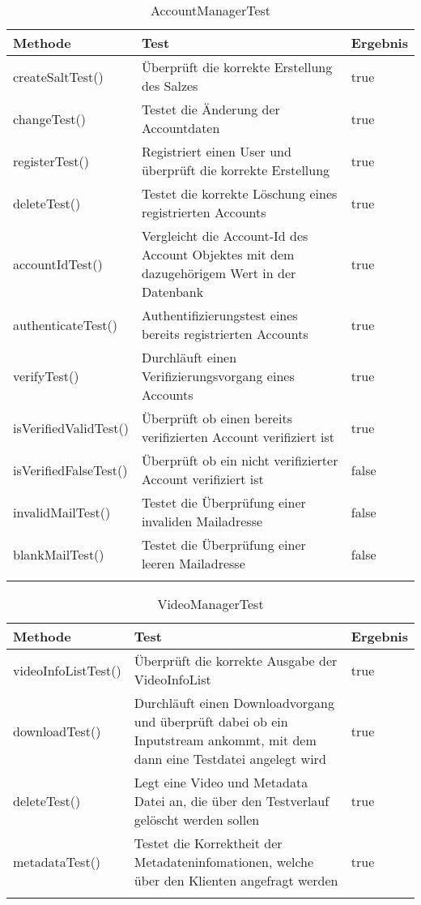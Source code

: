  \begin{longtable}{p{} | p{} | p{}}
\hline
  \textbf{Methode} & \textbf{Test} & \textbf{Ergebnis}\\
  \hline
  createSaltTest() & Überprüft die korrekte Erstellung des Salzes & true \\
  \hline
  changeTest() & Testet die Änderung der Accountdaten & true \\
  \hline
  registerTest() & Registriert einen User und überprüft die korrekte Erstellung & true \\
  \hline
  deleteTest() & Testet die korrekte Löschung eines registrierten Accounts & true \\
  \hline
  accountIdTest() & Vergleicht die Account-Id des Account Objektes mit dem dazugehörigem Wert in der Datenbank & true \\
  \hline
  authenticateTest() &  Authentifizierungstest eines bereits registrierten Accounts & true \\
  \hline
  verifyTest() & Durchläuft einen Verifizierungsvorgang eines Accounts & true \\
  \hline
  isVerifiedValidTest() & Überprüft ob einen bereits verifizierten Account verifiziert ist & true \\
  \hline
  isVerifiedFalseTest() & Überprüft ob ein nicht verifizierter Account verifiziert ist & false \\
  \hline
  invalidMailTest() & Testet die Überprüfung einer invaliden Mailadresse & false \\
  \hline
  blankMailTest() & Testet die Überprüfung einer leeren Mailadresse & false \\
  \hline
  \caption{AccountManagerTest}
 \end{longtable}
 
 \begin{longtable}{p{} | p{} | p{}}
\hline
  \textbf{Methode} & \textbf{Test} & \textbf{Ergebnis}\\
  \hline
  videoInfoListTest() & Überprüft die korrekte Ausgabe der VideoInfoList & true \\
  \hline
  downloadTest() & Durchläuft einen Downloadvorgang und überprüft dabei ob ein Inputstream ankommt, mit dem dann eine Testdatei angelegt wird & true \\
  \hline
  deleteTest() & Legt eine Video und Metadata Datei an, die über den Testverlauf gelöscht werden sollen & true \\ 
  \hline
  metadataTest() & Testet die Korrektheit  der Metadateninfomationen, welche über den Klienten angefragt werden & true \\
  \hline
  \caption{VideoManagerTest}
 \end{longtable}
 
